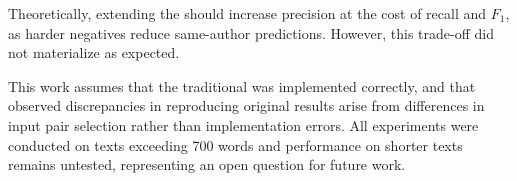 Theoretically, extending the \impAppr{} should increase precision at the cost of recall and $F_1$, as harder negatives reduce same-author predictions. 
However, this trade-off did not materialize as expected.

This work assumes that the traditional \impAppr{} was implemented correctly, and that observed discrepancies in reproducing original results arise from differences in input pair selection rather than implementation errors. 
All experiments were conducted on texts exceeding 700 words and performance on shorter texts remains untested, representing an open question for future work.
